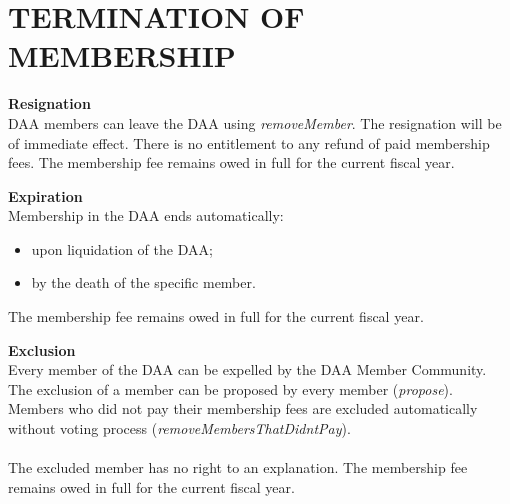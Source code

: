 \section{TERMINATION OF MEMBERSHIP}\label{sec:termination-of-membership}

\item \textbf{Resignation} \\
DAA members can leave the DAA using \emph{removeMember}.
The resignation will be of immediate effect.
There is no entitlement to any refund of paid membership fees.
The membership fee remains owed in full for the current fiscal year.

\item \textbf{Expiration} \\
Membership in the DAA ends automatically:
\begin{itemize}
    \item upon liquidation of the DAA;
    \item by the death of the specific member.
\end{itemize}
The membership fee remains owed in full for the current fiscal year.

\item \textbf{Exclusion} \\
Every member of the DAA can be expelled by the DAA Member Community.
The exclusion of a member can be proposed by every member (\emph{propose}).
Members who did not pay their membership fees are excluded automatically without voting process (\emph{removeMembersThatDidntPay}). \\ \\
The excluded member has no right to an explanation.
The membership fee remains owed in full for the current fiscal year.
